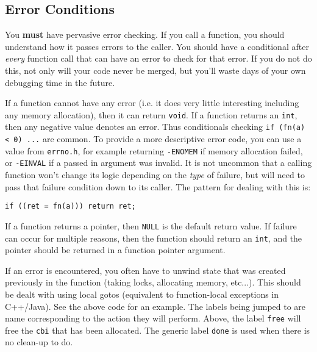 \documentclass[11pt,onecolumn]{article}
\newcommand{\head}[1]{\vspace{0.4em}\noindent{\bf #1}}
\begin{document}
\subsection{Error Conditions}

You {\bf must} have pervasive error checking.  If you call a function,
you should understand how it passes errors to the caller.  You should
have a conditional after {\em every} function call that can have an
error to check for that error.  If you do not do this, not only will
your code never be merged, but you'll waste days of your own debugging
time in the future.

\head{Error values.} If a function cannot have any error (i.e. it does
very little interesting including any memory allocation), then it can
return {\tt void}.  If a function returns an {\tt int}, then any
negative value denotes an error.  Thus conditionals checking {\tt if
  (fn(a) < 0) ...} are common.  To provide a more descriptive error
code, you can use a value from {\tt errno.h}, for example returning
{\tt -ENOMEM} if memory allocation failed, or {\tt -EINVAL} if a
passed in argument was invalid.  It is not uncommon that a calling
function won't change its logic depending on the {\em type} of
failure, but will need to pass that failure condition down to its
caller.  The pattern for dealing with this is:

    \begin{minipage}{3in}
      \footnotesize
      \lstset{language=C}
      \begin{lstlisting}
if ((ret = fn(a))) return ret;
      \end{lstlisting}
    \end{minipage}

If a function returns a pointer, then {\tt NULL} is the default return
value.  If failure can occur for multiple reasons, then the function
should return an {\tt int}, and the pointer should be returned in a
function pointer argument.

\head{Error handling.} If an error is encountered, you often have to
unwind state that was created previously in the function (taking
locks, allocating memory, etc...).  This should be dealt with using
local gotos (equivalent to function-local exceptions in C++/Java).
See the above code for an example.  The labels being jumped to are
name corresponding to the action they will perform.  Above, the label
{\tt free} will free the {\tt cbi} that has been allocated.  The
generic label {\tt done} is used when there is no clean-up to do.
\end{document}
